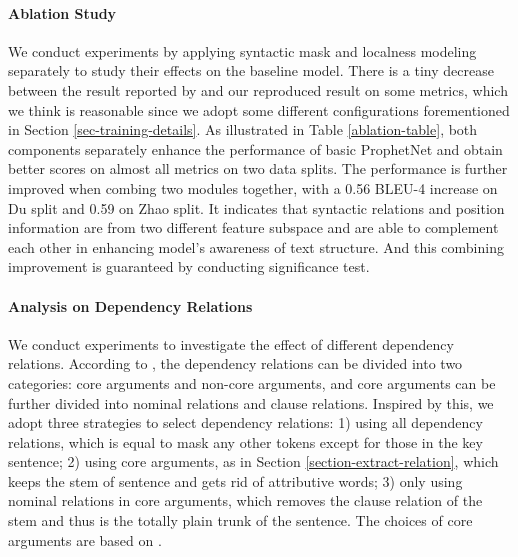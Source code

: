 \documentclass[11pt]{article}
\begin{document}
\paragraph{Ablation Study} We conduct experiments by applying syntactic mask and localness modeling separately to study their effects on the baseline model. There is a tiny decrease between the result reported by \citet{qi-etal-2020-prophetnet} and our reproduced result on some metrics, which we think is reasonable since we adopt some different configurations forementioned in Section \ref{sec-training-details}. As illustrated in Table \ref{ablation-table}, both components separately enhance the performance of basic ProphetNet and obtain better scores on almost all metrics on two data splits. The performance is further improved when combing two modules together, with a 0.56 BLEU-4 increase on Du split and 0.59 on Zhao split. It indicates that syntactic relations and position information are from two different feature subspace and are able to complement each other in enhancing model's awareness of text structure. And this combining improvement is guaranteed by conducting significance test. \paragraph{Analysis on Dependency Relations} \label{sec:analysis_dependency}
We conduct experiments to investigate the effect of different dependency relations.  
According to \citet{de-marneffe-etal-2014-universal}, the dependency relations can be divided into two categories: core arguments and non-core arguments, and core arguments can be further divided into nominal relations and clause relations. Inspired by this, we adopt three strategies to select dependency relations: 1) using all dependency relations, which is equal to mask any other tokens except for those in the key sentence; 2) using core arguments, as in Section \ref{section-extract-relation}, which keeps the stem of sentence and gets rid of attributive words; 3) only using nominal relations in core arguments, which removes the clause relation of the stem and thus is the totally plain trunk of the sentence. The choices of core arguments are based on \citet{de-marneffe-etal-2014-universal}.
\end{document}
